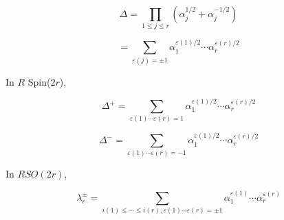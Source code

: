 $$\Delta = \prod_{1 \leq j \leq r} (\alpha_j^{1/2} + \alpha_j^{-1/2})$$

$$= \sum_{\varepsilon(j) = \pm 1} \alpha_1^{\varepsilon(1)/2} \cdots \alpha_r^{\varepsilon(r)/2}$$

In $R$ Spin($2r$),

$$\Delta^+ = \sum_{\varepsilon(1) \cdots \varepsilon(r) = 1} \alpha_1^{\varepsilon(1)/2} \cdots \alpha_r^{\varepsilon(r)/2}$$

$$\Delta^- = \sum_{\varepsilon(1) \cdots \varepsilon(r) = -1} \alpha_1^{\varepsilon(1)/2} \cdots \alpha_r^{\varepsilon(r)/2}$$

In $RSO(2r)$,

$$\lambda_r^\pm = \sum_{i(1) \leq \cdots \leq i(r), \varepsilon(1) \cdots \varepsilon(r) = \pm 1} \alpha_1^{\varepsilon(1)} \cdots \alpha_r^{\varepsilon(r)}$$
